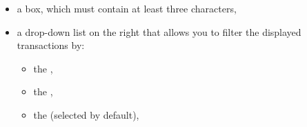 \begin{itemize}
\begin{itemize}
	 		\item whether or not to display ,
	 		\item whether or not to display the  (\vref{datamanagement-archive-display}).
		\end{itemize}
		\Note{}: the options in the  menu affect the display of all accounts by default. You may prefer a different display for each account; this can be configured in the  menu (see the section \vref{setup-operations-list-differentiation}, ).
	\item a  box, which must contain at least three characters,
	\item a drop-down list on the right that allows you to filter the displayed transactions by:
		\begin{itemize} 
			\item the ,
			\item the ,
			\item the  (selected by default),

\end{itemize}
\end{itemize}
